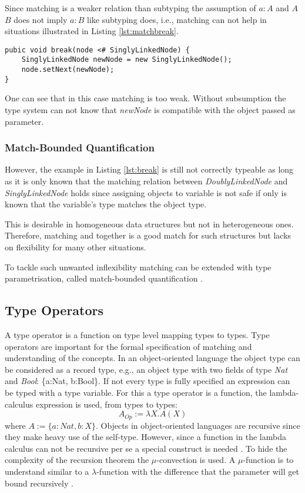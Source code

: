 Since matching is a weaker relation than subtyping the assumption of $a:A$
and $A$ \match $B$ does not imply $a:B$ like subtyping does, i.e., matching
can not help in situations illustrated in Listing \ref{lst:matchbreak}.

\begin{lstlisting}[float,label={lst:matchbreak},caption={Matching relation in the break method}]
pubic void break(node <# SinglyLinkedNode) {
	SinglyLinkedNode newNode = new SinglyLinkedNode();
	node.setNext(newNode);
}
\end{lstlisting}

One can see that in this case matching is too weak. Without subsumption the type system
can not know that \emph{newNode} is compatible with the object passed as parameter.

\subsubsection{Match-Bounded Quantification}
However, the example in Listing \ref{lst:break} is still not correctly
typeable as long as it is only known that the matching relation between
\emph{DoublyLinkedNode} and \emph{SinglyLinkedNode} holds since assigning
objects to variable is not safe if only is known that the variable's type
matches the object type. 

This is desirable in homogeneous data structures
but not in heterogeneous ones. Therefore, matching and \mytype together is a good match
for such structures but lacks on flexibility for many other situations.

To tackle such unwanted inflexibility matching can be extended
with type parametrisation, called match-bounded quantification
\cite{abadi_subtyping_1996}. 

\subsection{Type Operators}
A type operator is a function on type level mapping types to types. Type
operators are important for the formal specification of matching and
understanding of the concepts. In an object-oriented language the object
type can be considered as a record type, e.g., an object type with two
fields of type \emph{Nat} and \emph{Bool}: \{a:Nat, b:Bool\}. If not
every type is fully specified an expression can be typed with a type
variable. For this a type operator is a function, the lambda-calculus
expression is used, from types to types: \[A_{Op} := \lambda X.A(X)
\] where $A := \{a:Nat, b:X\}$. Objects in object-oriented languages are
recursive since they make heavy use of the self-type. However, since a
function in the lambda calculus can not be recursive per se a special
construct is needed \cite{gabriel_why_1988}.  To hide the complexity of
the recursion theorem the $\mu$-convection is used. A $\mu$-function is
to understand similar to a $\lambda$-function with the difference that
the parameter will get bound recursively \cite{simons_theory_2002-3}.

